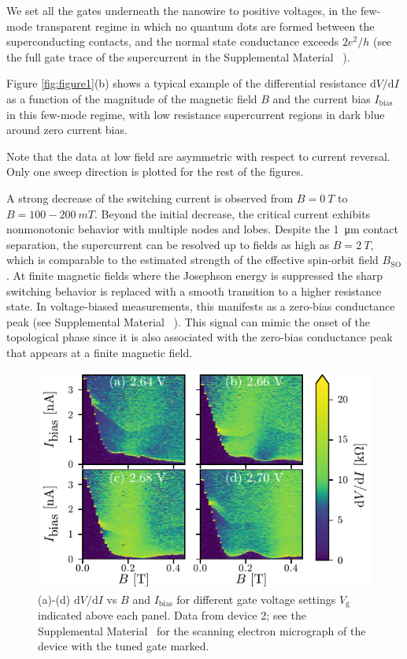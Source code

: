 \documentclass[english, twocolumn, 10pt, aps, superscriptaddress, floatfix, showpacs, prb, citeautoscript]{revtex4-1}
\begin{document}
We set all the gates underneath the nanowire to positive voltages, in the few-mode transparent regime in which no quantum dots are formed between the superconducting contacts, and the normal state conductance exceeds $2e^2/h$ (see the full gate trace of the supercurrent in the Supplemental Material ~\cite{supp}).

Figure \ref{fig:figure1}(b) shows a typical example of the differential resistance $\mathrm{d}V/\mathrm{d}I$ as a function of the magnitude of the magnetic field $B$ and the current bias $I_\mathrm{bias}$ in this few-mode regime, with low resistance supercurrent regions in dark blue around zero current bias. 

Note that the data at low field are asymmetric with respect to current reversal. Only one sweep direction is plotted for the rest of the figures.

A strong decrease of the switching current is observed from $B=\SI{0}{T}$ to $B=100-\SI{200}{mT}$. 
Beyond the initial decrease, the critical current exhibits nonmonotonic behavior with multiple nodes and lobes. 
Despite the \SI{1}{\micro \meter} contact separation, the supercurrent can be resolved up to fields as high as $B=\SI{2}{T}$, which is comparable to the estimated strength of the effective spin-orbit field $B_\mathrm{SO}$.
At finite magnetic fields where the Josephson energy is suppressed the sharp switching behavior is replaced with a smooth transition to a higher resistance state. 
In voltage-biased measurements, this manifests as a zero-bias conductance peak (see Supplemental Material ~\cite{supp}). 
This signal can mimic the onset of the topological phase since it is also associated with the zero-bias conductance peak that appears at a finite magnetic field.

\begin{figure}[t]
\includegraphics[width=\columnwidth]{figures/fig2.pdf}
\caption{(a)-(d) $\mathrm{d}V/\mathrm{d}I$ vs $B$ and $I_\mathrm{bias}$ for different gate voltage settings $V_\mathrm{g}$ indicated above each panel.  Data from device 2; see the Supplemental Material~\cite{supp} for the scanning electron micrograph of the device with the tuned gate marked.}
\label{fig:figure2}
\end{figure}
\end{document}
